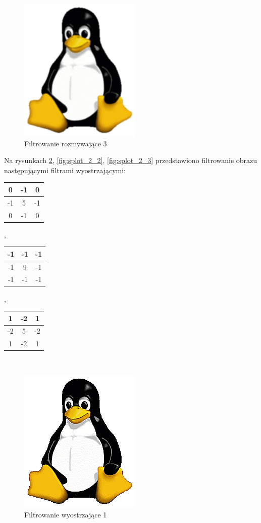 \documentclass[12pt, a4paper]{article}
\begin{document}
\begin{figure}[p]
\includegraphics{splot_1_3}
\caption{Filtrowanie rozmywające 3}
\label{fig:splot_1_3}
\end{figure}
Na rysunkach \ref{fig:splot_2_1}, \ref{fig:splot_2_2}, \ref{fig:splot_2_3} przedstawiono filtrowanie obrazu następującymi filtrami wyostrzającymi:\\
\begin{tabular}{c|c|c}
0&-1&0\\ \hline
-1&5&-1\\ \hline
0&-1&0\\
\end{tabular},
\begin{tabular}{c|c|c}
-1&-1&-1\\ \hline
-1&9&-1\\ \hline
-1&-1&-1\\
\end{tabular},
\begin{tabular}{c|c|c}
1&-2&1\\ \hline
-2&5&-2\\ \hline
1&-2&1\\
\end{tabular}\\
\begin{figure}[p]
\includegraphics{splot_2_1}
\caption{Filtrowanie wyostrzające 1}
\label{fig:splot_2_1}
\end{figure}
\end{document}
